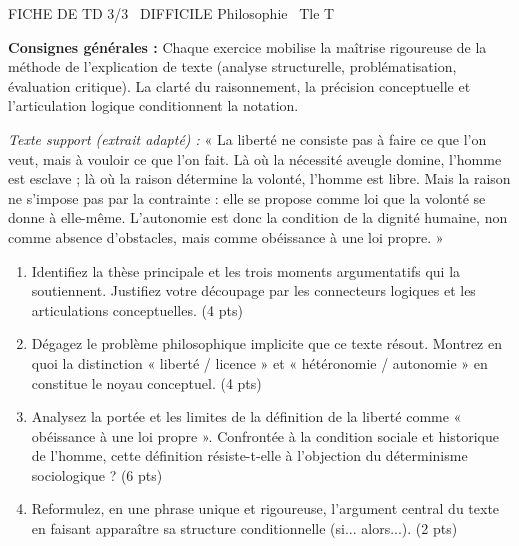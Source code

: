 \documentclass[11pt]{article}
\begin{document}
\begin{tcolorbox}[enhanced,colback=popink,colframe=popink,arc=10pt,boxrule=0pt,left=12pt,right=12pt,top=9pt,bottom=9pt]
{\color{white}\popxbold\small FICHE DE TD 3/3 \textbullet\ DIFFICILE \hfill Philosophie \textbullet\ Tle T\par}
\end{tcolorbox}
\vspace{4pt}
\noindent \textbf{Consignes générales :} Chaque exercice mobilise la maîtrise rigoureuse de la méthode de l'explication de texte (analyse structurelle, problématisation, évaluation critique). La clarté du raisonnement, la précision conceptuelle et l'articulation logique conditionnent la notation.

\begin{exercice}
\textit{Texte support (extrait adapté) :} « La liberté ne consiste pas à faire ce que l'on veut, mais à vouloir ce que l'on fait. Là où la nécessité aveugle domine, l'homme est esclave ; là où la raison détermine la volonté, l'homme est libre. Mais la raison ne s'impose pas par la contrainte : elle se propose comme loi que la volonté se donne à elle-même. L'autonomie est donc la condition de la dignité humaine, non comme absence d'obstacles, mais comme obéissance à une loi propre. » \\
\begin{enumerate}
    \item Identifiez la thèse principale et les trois moments argumentatifs qui la soutiennent. Justifiez votre découpage par les connecteurs logiques et les articulations conceptuelles. (4 pts)
    \item Dégagez le problème philosophique implicite que ce texte résout. Montrez en quoi la distinction « liberté / licence » et « hétéronomie / autonomie » en constitue le noyau conceptuel. (4 pts)
    \item Analysez la portée et les limites de la définition de la liberté comme « obéissance à une loi propre ». Confrontée à la condition sociale et historique de l'homme, cette définition résiste-t-elle à l'objection du déterminisme sociologique ? (6 pts)
    \item Reformulez, en une phrase unique et rigoureuse, l'argument central du texte en faisant apparaître sa structure conditionnelle (si... alors...). (2 pts)
\end{enumerate}
\end{exercice}
\end{document}

